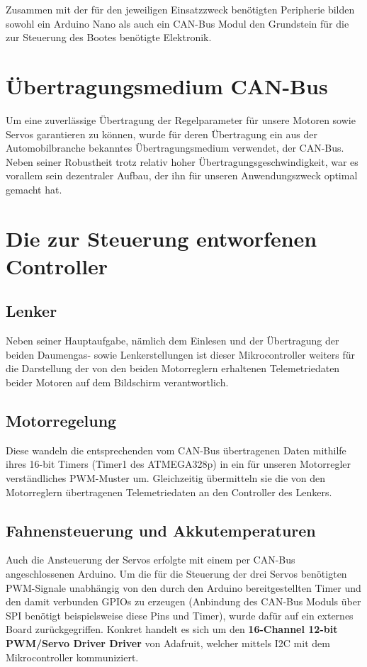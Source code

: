 Zusammen mit der für den jeweiligen Einsatzzweck benötigten Peripherie bilden sowohl ein Arduino Nano als auch ein CAN-Bus Modul den Grundstein für die zur Steuerung des Bootes benötigte Elektronik.  
\section{Übertragungsmedium CAN-Bus}
Um eine zuverlässige Übertragung der Regelparameter für unsere Motoren sowie Servos garantieren zu können, wurde für deren Übertragung ein aus der Automobilbranche bekanntes Übertragungsmedium verwendet, der CAN-Bus. 
Neben seiner Robustheit trotz relativ hoher Übertragungsgeschwindigkeit, war es vorallem sein dezentraler Aufbau, der ihn für unseren Anwendungszweck optimal gemacht hat.

\newpage
\section{Die zur Steuerung entworfenen Controller}
\subsection{Lenker}
Neben seiner Hauptaufgabe, nämlich dem Einlesen und der Übertragung der beiden Daumengas- sowie Lenkerstellungen ist dieser Mikrocontroller weiters für die Darstellung der von den beiden Motorreglern erhaltenen Telemetriedaten beider Motoren auf dem Bildschirm verantwortlich.
\subsection{Motorregelung}
Diese wandeln die entsprechenden vom CAN-Bus übertragenen Daten mithilfe ihres 16-bit Timers (Timer1 des ATMEGA328p) in ein für unseren Motorregler verständliches PWM-Muster um.
Gleichzeitig übermitteln sie die von den Motorreglern übertragenen Telemetriedaten an den Controller des Lenkers.
\subsection{Fahnensteuerung und Akkutemperaturen}
Auch die Ansteuerung der Servos erfolgte mit einem per CAN-Bus angeschlossenen Arduino. Um die für die Steuerung der drei Servos benötigten PWM-Signale unabhängig von den durch den Arduino bereitgestellten Timer und den damit verbunden GPIOs zu erzeugen 
(Anbindung des CAN-Bus Moduls über SPI benötigt beispielsweise diese Pins und Timer), wurde dafür auf ein externes Board zurückgegriffen.
Konkret handelt es sich um den \textbf{16-Channel 12-bit PWM/Servo Driver Driver} von Adafruit, welcher mittels I2C mit dem Mikrocontroller kommuniziert.\\

